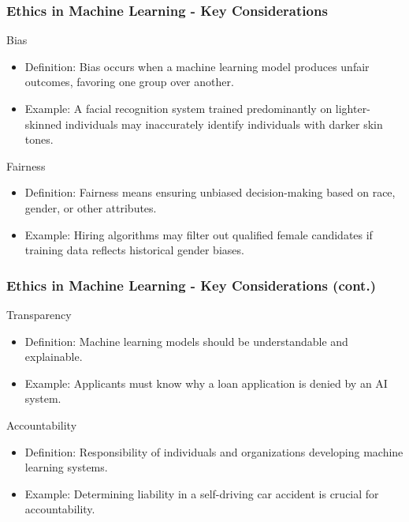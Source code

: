 \documentclass[aspectratio=169]{beamer}
\begin{document}
\begin{frame}[fragile]
    \frametitle{Ethics in Machine Learning - Key Considerations}
    \begin{block}{Bias}
        \begin{itemize}
            \item Definition: Bias occurs when a machine learning model produces unfair outcomes, favoring one group over another.
            \item Example: A facial recognition system trained predominantly on lighter-skinned individuals may inaccurately identify individuals with darker skin tones.
        \end{itemize}
    \end{block}
    
    \begin{block}{Fairness}
        \begin{itemize}
            \item Definition: Fairness means ensuring unbiased decision-making based on race, gender, or other attributes.
            \item Example: Hiring algorithms may filter out qualified female candidates if training data reflects historical gender biases.
        \end{itemize}
    \end{block}
\end{frame}

\begin{frame}[fragile]
    \frametitle{Ethics in Machine Learning - Key Considerations (cont.)}
    \begin{block}{Transparency}
        \begin{itemize}
            \item Definition: Machine learning models should be understandable and explainable.
            \item Example: Applicants must know why a loan application is denied by an AI system.
        \end{itemize}
    \end{block}
    
    \begin{block}{Accountability}
        \begin{itemize}
            \item Definition: Responsibility of individuals and organizations developing machine learning systems.
            \item Example: Determining liability in a self-driving car accident is crucial for accountability.
        \end{itemize}
    \end{block}
\end{frame}
\end{document}
